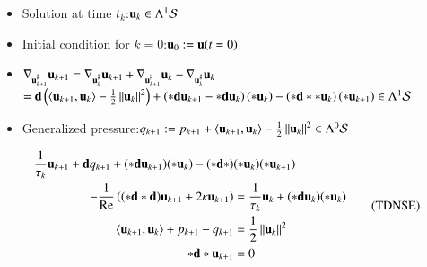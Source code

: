 \documentclass[15pt,t,aspectratio=1610]{beamer}
\begin{document}
  \begin{frame}
    \begin{itemize}
      \item Solution at time \( t_{k} \):\quad \( \mathbf{u}_{k}\in\Lambda^{1}\mathcal{S} \)
      \item Initial condition for \( k=0 \):\quad \( \mathbf{u}_{0} := \mathbf{u}(t=0) \)
      \item \( \nabla_{\mathbf{u}^{\sharp}_{k+1}}\mathbf{u}_{k+1} = \nabla_{\mathbf{u}^{\sharp}_{k}}\mathbf{u}_{k+1} + \nabla_{\mathbf{u}^{\sharp}_{k+1}}\mathbf{u}_{k} - \nabla_{\mathbf{u}^{\sharp}_{k}}\mathbf{u}_{k}\)
                  \(= \mathbf{d}\left( \left\langle \mathbf{u}_{k+1},\mathbf{u}_{k} \right\rangle - \frac{1}{2}\left\| \mathbf{u}_{k} \right\|^{2} \right)
                       +\left( *\mathbf{d}\mathbf{u}_{k+1} - *\mathbf{d}\mathbf{u}_{k} \right)\left( *\mathbf{u}_{k} \right) - \left( *\mathbf{d}**\mathbf{u}_{k} \right)\left( *\mathbf{u}_{k+1} \right)\in\Lambda^{1}\mathcal{S}\)
      \item Generalized pressure:\quad \( q_{k+1} := p_{k+1} + \left\langle \mathbf{u}_{k+1},\mathbf{u}_{k} \right\rangle - \frac{1}{2}\left\| \mathbf{u}_{k} \right\|^{2} \in \Lambda^{0}\mathcal{S}  \)
    \end{itemize}
    \begin{align}
      \begin{aligned}
    	\frac{1}{\tau_{k}}\mathbf{u}_{k+1} + \mathbf{d} q_{k+1} + (* \mathbf{d} \mathbf{u}_{k+1})(* \mathbf{u}_{k}) - (*\mathbf{d} * )&(* \mathbf{u}_{k})(* \mathbf{u}_{k+1}) \nonumber \\ 
    	- \frac{1}{\text{Re}} \left(  (*\mathbf{d} * \mathbf{d}) \mathbf{u}_{k+1} + 2\kappa \mathbf{u}_{k+1} \right) &= \frac{1}{\tau_{k}}\mathbf{u}_{k} + (* \mathbf{d}\mathbf{u}_{k})(* \mathbf{u}_{k}) \\
    	\left\langle \mathbf{u}_{k+1}, \mathbf{u}_{k} \right\rangle + p_{k+1} - q_{k+1} &= \frac{1}{2}\left\| \mathbf{u}_{k} \right\|^{2} \\
    	* \mathbf{d} * \mathbf{u}_{k+1} &= 0 
      \end{aligned}\tag{TDNSE}
    \end{align}
  \end{frame}
\end{document}

